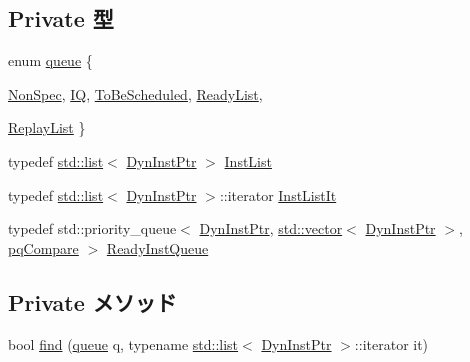 \subsection*{Private 型}
\begin{DoxyCompactItemize}
\item 
enum \hyperlink{classBackEnd_1_1InstQueue_af8ceabb22d9297bd28382151f35a2252}{queue} \{ \par
\hyperlink{classBackEnd_1_1InstQueue_af8ceabb22d9297bd28382151f35a2252aaee95c287c473832b4e60a841e2211ff}{NonSpec}, 
\hyperlink{classBackEnd_1_1InstQueue_af8ceabb22d9297bd28382151f35a2252a7608065caa4249ff47a58c32d6f3c531}{IQ}, 
\hyperlink{classBackEnd_1_1InstQueue_af8ceabb22d9297bd28382151f35a2252a9e2b065397f5c9551ce86c194a700a6d}{ToBeScheduled}, 
\hyperlink{classBackEnd_1_1InstQueue_af8ceabb22d9297bd28382151f35a2252a7c2a1b33083108fc8d494fa70df4efec}{ReadyList}, 
\par
\hyperlink{classBackEnd_1_1InstQueue_af8ceabb22d9297bd28382151f35a2252a170394fd5c7e033a2d09b135e567b083}{ReplayList}
 \}
\item 
typedef \hyperlink{classstd_1_1list}{std::list}$<$ \hyperlink{classBackEnd_a028ce10889c5f6450239d9e9a7347976}{DynInstPtr} $>$ \hyperlink{classBackEnd_1_1InstQueue_a989b991619bb58d499f278a94c31744b}{InstList}
\item 
typedef \hyperlink{classstd_1_1list}{std::list}$<$ \hyperlink{classBackEnd_a028ce10889c5f6450239d9e9a7347976}{DynInstPtr} $>$::iterator \hyperlink{classBackEnd_1_1InstQueue_a4da46d72d68fcd5bfe65dc701c358379}{InstListIt}
\item 
typedef std::priority\_\-queue$<$ \hyperlink{classBackEnd_a028ce10889c5f6450239d9e9a7347976}{DynInstPtr}, \hyperlink{classstd_1_1vector}{std::vector}$<$ \hyperlink{classBackEnd_a028ce10889c5f6450239d9e9a7347976}{DynInstPtr} $>$, \hyperlink{structBackEnd_1_1InstQueue_1_1pqCompare}{pqCompare} $>$ \hyperlink{classBackEnd_1_1InstQueue_a60636ae8f3b649078c4f1bdd3b20dcad}{ReadyInstQueue}
\end{DoxyCompactItemize}
\subsection*{Private メソッド}
\begin{DoxyCompactItemize}
\item 
bool \hyperlink{classBackEnd_1_1InstQueue_aea2496e092fdfa5953ee18676dcc78da}{find} (\hyperlink{classBackEnd_1_1InstQueue_af8ceabb22d9297bd28382151f35a2252}{queue} q, typename \hyperlink{classstd_1_1list}{std::list}$<$ \hyperlink{classBackEnd_a028ce10889c5f6450239d9e9a7347976}{DynInstPtr} $>$::iterator it)
\end{DoxyCompactItemize}
